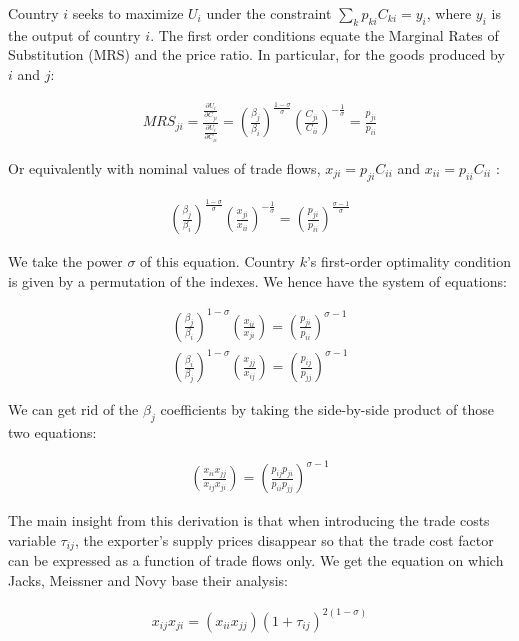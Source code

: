 \documentclass{article}
\begin{document}
Country $i$ seeks to maximize $U_i$ under the constraint
$\sum_k p_{ki} C_{ki}=y_i$, where $y_i$ is the output of
country $i$. The first order conditions equate the Marginal
Rates of Substitution (MRS) and the price ratio. In particular,
for the goods produced by $i$ and $j$:

\begin{eqnarray*}
MRS_{ji}=\frac{\frac{\partial U_i}{\partial C_{ji}}}{\frac{\partial
U_i}{\partial C_{ii}}}=
\left(\frac{\beta_j}{\beta_i}\right)^{\frac{1-\sigma}{\sigma}}\left(\frac{C_{ji}}{C_{ii}}\right)^{-\frac{1}{\sigma}}=\frac{p_{ji}}{p_{ii}}
\end{eqnarray*}

Or equivalently with nominal values of trade flows,
$x_{ji}=p_{ji}C_{ii}$ and $x_{ii}=p_{ii}C_{ii}$ :

\begin{eqnarray*}
\left(\frac{\beta_j}{\beta_i}\right)^{\frac{1-\sigma}{\sigma}}\left(\frac{x_{ji}}{x_{ii}}\right)^{-\frac{1}{\sigma}}=\left(\frac{p_{ji}}{p_{ii}}\right)^{\frac{\sigma-1}{\sigma}}
\end{eqnarray*}

We take the power $\sigma$ of this equation. Country $k$'s
first-order optimality condition is given by a permutation of
the indexes. We hence have the system of equations:

\begin{eqnarray*}
\left(\frac{\beta_j}{\beta_i}\right)^{1-\sigma}\left(\frac{x_{ii}}{x_{ji}}\right)=\left(\frac{p_{ji}}{p_{ii}}\right)^{\sigma-1}\\
\left(\frac{\beta_i}{\beta_j}\right)^{1-\sigma}\left(\frac{x_{jj}}{x_{ij}}\right)=\left(\frac{p_{ij}}{p_{jj}}\right)^{\sigma-1}
\end{eqnarray*}

We can get rid of the $\beta_j$ coefficients by taking the
side-by-side product of those two equations:

\begin{eqnarray*}
\left(\frac{x_{ii} x_{jj}}{x_{ij} x_{ji}}\right)=\left(\frac{p_{ij}
p_{ji}}{p_{ii} p_{jj}}\right)^{\sigma-1}
\end{eqnarray*}

The main insight from this derivation is that when introducing
the trade costs variable $\tau_{ij}$, the exporter's supply
prices disappear so that the trade cost factor can be expressed
as a function of trade flows only. We get the equation on which
Jacks, Meissner and Novy base their analysis:

\begin{eqnarray*}
x_{ij} x_{ji} =(x_{ii} x_{jj}) (1+\tau_{ij})^{2(1-\sigma)}
\end{eqnarray*}
\end{document}
